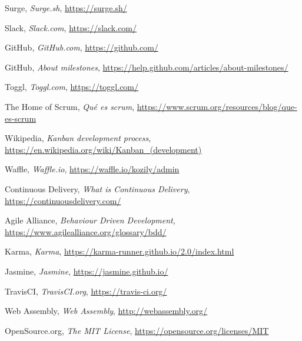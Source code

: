 \documentclass[a4paper,11pt]{article}
\begin{document}
\begin{thebibliography}{9}
Surge,
\textit{Surge.sh},
\url{https://surge.sh/}

Slack,
\textit{Slack.com},
\url{https://slack.com/}

GitHub,
\textit{GitHub.com},
\url{https://github.com/}

GitHub,
\textit{About milestones},
\url{https://help.github.com/articles/about-milestones/}

Toggl,
\textit{Toggl.com},
\url{https://toggl.com/}

The Home of Scrum,
\textit{Qué es scrum},
\url{https://www.scrum.org/resources/blog/que-es-scrum}

Wikipedia,
\textit{Kanban development process},
\url{https://en.wikipedia.org/wiki/Kanban_(development)}

Waffle,
\textit{Waffle.io},
\url{https://waffle.io/kozily/admin}

Continuous Delivery,
\textit{What is Continuous Delivery},
\url{https://continuousdelivery.com/}

Agile Alliance,
\textit{Behaviour Driven Development},
\url{https://www.agilealliance.org/glossary/bdd/}

Karma,
\textit{Karma},
\url{https://karma-runner.github.io/2.0/index.html}

Jasmine,
\textit{Jasmine},
\url{https://jasmine.github.io/}

TravisCI,
\textit{TravisCI.org},
\url{https://travis-ci.org/}

Web Assembly,
\textit{Web Assembly},
\url{http://webassembly.org/}

OpenSource.org,
\textit{The MIT License},
\url{https://opensource.org/licenses/MIT}


\end{thebibliography}
\end{document}

